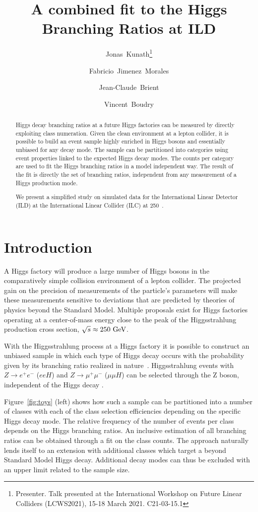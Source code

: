 \documentclass[11pt, hidelinks, a4paper]{scrartcl}
\title{\textbf{A combined fit to the Higgs Branching Ratios at ILD} }
\author{Jonas~Kunath\thanks{Presenter.
    Talk presented at the International Workshop on Future Linear Colliders (LCWS2021),
    15-18 March 2021. C21-03-15.1}
}
\author{Fabricio~Jimenez~Morales}
\author{Jean-Claude~Brient}
\author{Vincent~Boudry}
\affil{Laboratoire Leprince-Ringuet CNRS, \'Ecole Polytechnique,\hspace{2em} Institut Polytechnique de Paris, France}
\date{}
\newcommand{\eV}{\text{e\kern-0.15ex V}\xspace}
\newcommand{\GeV}{\text{G\eV}\xspace}
\begin{document}
\maketitle
\begin{abstract}
Higgs decay branching ratios at a future Higgs factories
can be measured by directly exploiting class numeration.
Given the clean environment at a lepton collider,
it is possible to build an event sample highly enriched in Higgs bosons
and essentially unbiased for any decay mode.
The sample can be partitioned into categories using event properties
linked to the expected Higgs decay modes.
The counts per category are used to fit
the Higgs branching ratios in a model independent way.
The result of the fit is directly the set of branching ratios,
independent from any measurement of a Higgs production mode.

We present a simplified study on simulated data
for the International Linear Detector (ILD)
at the International Linear Collider (ILC) at 250~\GeV.
\end{abstract}

\section{Introduction}
A Higgs factory will produce a large number of Higgs bosons
in the comparatively simple collision environment of a lepton collider.
The projected gain on the precision of measurements of the particle's parameters
will make these measurements sensitive to deviations
that are predicted by theories of physics beyond the Standard Model.
Multiple proposals exist for Higgs factories operating at a center-of-mass energy
close to the peak of the Higgsstrahlung production cross section,
$\sqrt{s}\approx250~\GeV$.

With the Higgsstrahlung process at a Higgs factory
it is possible to construct an unbiased sample
in which each type of Higgs decay occurs with the probability given by
its branching ratio realized in nature~\cite{HiggsBR_LCWS2019}.
Higgsstrahlung events with $Z \to e^+e^-$ ($e e H$)
and $Z \to \mu^+ \mu^-$ ($\mu \mu H$) can be selected through
the Z boson, independent of the Higgs decay \cite{hRecoilIndependence}.

Figure~\ref{fig:toys} (left) shows how such a sample can be partitioned
into a number of classes with each of the class selection efficiencies depending
on the specific Higgs decay mode.
The relative frequency of the number of events per class
depends on the Higgs branching ratios.
An inclusive estimation of all branching ratios can be obtained
through a fit on the class counts.
The approach naturally lends itself to an extension with additional classes
which target a beyond Standard Model Higgs decay.
Additional decay modes can thus be excluded
with an upper limit related to the sample size.
\end{document}
